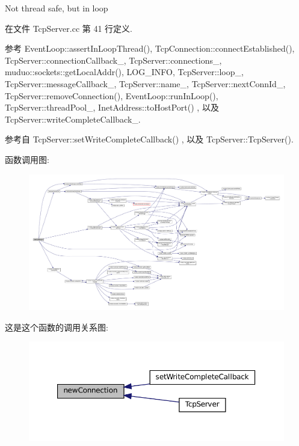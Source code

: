 Not thread safe, but in loop 



在文件 Tcp\+Server.\+cc 第 41 行定义.



参考 Event\+Loop\+::assert\+In\+Loop\+Thread(), Tcp\+Connection\+::connect\+Established(), Tcp\+Server\+::connection\+Callback\+\_\+, Tcp\+Server\+::connections\+\_\+, muduo\+::sockets\+::get\+Local\+Addr(), L\+O\+G\+\_\+\+I\+N\+FO, Tcp\+Server\+::loop\+\_\+, Tcp\+Server\+::message\+Callback\+\_\+, Tcp\+Server\+::name\+\_\+, Tcp\+Server\+::next\+Conn\+Id\+\_\+, Tcp\+Server\+::remove\+Connection(), Event\+Loop\+::run\+In\+Loop(), Tcp\+Server\+::thread\+Pool\+\_\+, Inet\+Address\+::to\+Host\+Port() , 以及 Tcp\+Server\+::write\+Complete\+Callback\+\_\+.



参考自 Tcp\+Server\+::set\+Write\+Complete\+Callback() , 以及 Tcp\+Server\+::\+Tcp\+Server().

函数调用图\+:
\nopagebreak
\begin{figure}[H]
\begin{center}
\leavevmode
\includegraphics[width=350pt]{classmuduo_1_1TcpServer_a6e7510f45cfa67ddc79aa8689fd79562_cgraph}
\end{center}
\end{figure}
这是这个函数的调用关系图\+:
\nopagebreak
\begin{figure}[H]
\begin{center}
\leavevmode
\includegraphics[width=350pt]{classmuduo_1_1TcpServer_a6e7510f45cfa67ddc79aa8689fd79562_icgraph}
\end{center}
\end{figure}
\mbox{\label{classmuduo_1_1TcpServer_ad9661c3f05443256c9439f812d1a7691}} 
